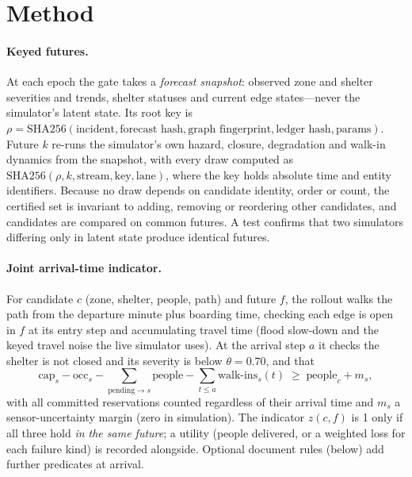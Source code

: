 \documentclass[letterpaper]{article}
\begin{document}
\section{Method}

\paragraph{Keyed futures.} At each epoch the gate takes a \emph{forecast snapshot}: observed zone and
shelter severities and trends, shelter statuses and current edge states---never the simulator's latent
state. Its root key is
$\rho=\mathrm{SHA256}(\text{incident},\text{forecast hash},\text{graph fingerprint},\text{ledger hash},
\text{params})$. Future $k$ re-runs the simulator's own hazard, closure, degradation and walk-in dynamics
from the snapshot, with every draw computed as
$\mathrm{SHA256}(\rho,k,\text{stream},\text{key},\text{lane})$, where the key holds absolute time and
entity identifiers. Because no draw depends on candidate identity, order or count, the certified set is
invariant to adding, removing or reordering other candidates, and candidates are compared on common
futures. A test confirms that two simulators differing only in latent state produce identical futures.

\paragraph{Joint arrival-time indicator.} For candidate $c$ (zone, shelter, people, path) and future
$f$, the rollout walks the path from the departure minute plus boarding time, checking each edge is
open in $f$ at its entry step and accumulating travel time (flood slow-down and the keyed travel noise
the live simulator uses). At the arrival step $a$ it checks the shelter is not closed and its severity
is below $\theta=0.70$, and that
\[
  \mathrm{cap}_s-\mathrm{occ}_s-\textstyle\sum_{\text{pending}\to s}\text{people}
  -\sum_{t\le a}\text{walk-ins}_s(t) \;\ge\; \text{people}_c + m_s ,
\]
with all committed reservations counted regardless of their arrival time and $m_s$ a sensor-uncertainty
margin (zero in simulation). The indicator $z(c,f)$ is 1 only if all three hold \emph{in the same future};
a utility (people delivered, or a weighted loss for each failure kind) is recorded alongside.
Optional document rules (below) add further predicates at arrival.
\end{document}
